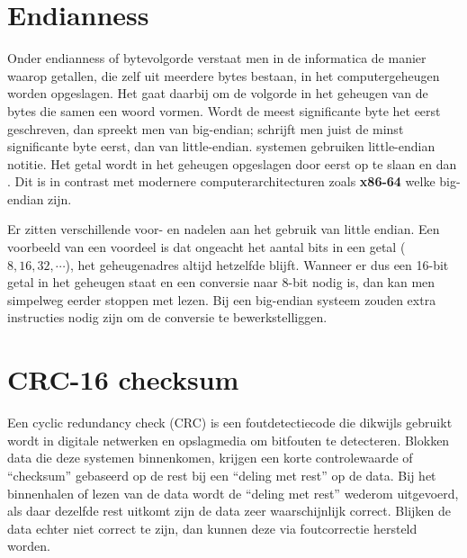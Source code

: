 

%
%
%
\section{Endianness}
\label{sec:endianness}


Onder endianness of bytevolgorde verstaat men in de informatica de manier waarop getallen, die zelf uit meerdere bytes bestaan, in het computergeheugen worden opgeslagen. Het gaat daarbij om de volgorde in het geheugen van de bytes die samen een woord vormen. Wordt de meest significante byte het eerst geschreven, dan spreekt men van big-endian; schrijft men juist de minst significante byte eerst, dan van little-endian.  systemen gebruiken little-endian notitie. Het getal  wordt in het geheugen opgeslagen door eerst  op te slaan en dan . Dit is in contrast met modernere computerarchitecturen zoals \textbf{x86-64} welke big-endian zijn.

Er zitten verschillende voor- en nadelen aan het gebruik van little endian. Een voorbeeld van een voordeel is dat ongeacht het aantal bits in een getal ($8, 16, 32, \cdots$), het geheugenadres altijd hetzelfde blijft. Wanneer er dus een 16-bit getal in het geheugen staat en een conversie naar 8-bit nodig is, dan kan men simpelweg eerder stoppen met lezen. Bij een big-endian systeem zouden extra instructies nodig zijn om de conversie te bewerkstelliggen.

%
%
%
\section{CRC-16 checksum}
\label{sec:crc16-checksum}


Een cyclic redundancy check (CRC) is een foutdetectiecode die dikwijls gebruikt wordt in digitale netwerken en opslagmedia om bitfouten te detecteren. Blokken data die deze systemen binnenkomen, krijgen een korte controlewaarde of ``checksum'' gebaseerd op de rest bij een ``deling met rest'' op de data. Bij het binnenhalen of lezen van de data wordt de ``deling met rest'' wederom uitgevoerd, als daar dezelfde rest uitkomt zijn de data zeer waarschijnlijk correct. Blijken de data echter niet correct te zijn, dan kunnen deze via foutcorrectie hersteld worden.

